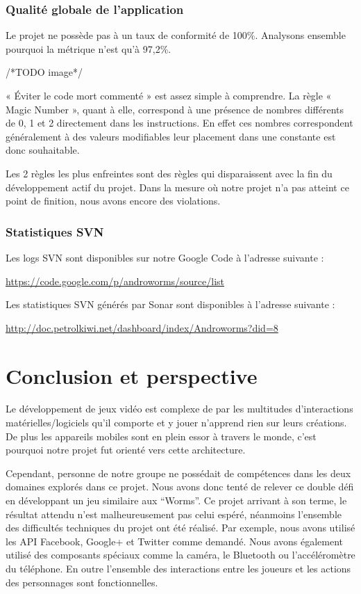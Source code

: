 \documentclass{report}
\begin{document}
\subsubsection{Qualité globale de l’application}

Le projet ne possède pas à un taux de conformité de 100\%. Analysons ensemble pourquoi la  métrique n’est qu’à 97,2\%.

/*TODO image*/

« Éviter le code mort commenté » est assez simple à comprendre. La règle « Magic Number », quant à elle, correspond à une présence de nombres différents de 0, 1 et 2 directement dans les instructions. En effet ces nombres correspondent généralement à des valeurs modifiables leur placement dans une constante est donc souhaitable.

Les 2 règles les plus enfreintes sont des règles qui disparaissent avec la fin du développement actif du projet. Dans la mesure où notre projet n’a pas atteint ce point de finition, nous avons encore des violations.

\subsubsection{Statistiques SVN}

Les logs SVN sont disponibles sur notre Google Code à l’adresse suivante :

\url{https://code.google.com/p/androworms/source/list}

\bigskip

Les statistiques SVN générés par Sonar sont disponibles à l’adresse suivante :

\url{http://doc.petrolkiwi.net/dashboard/index/Androworms?did=8}


\section{Conclusion et perspective}

Le développement de jeux vidéo est complexe de par les multitudes d’interactions matérielles/logiciels qu’il comporte et y jouer n’apprend rien sur leurs créations. De plus les appareils mobiles sont en plein essor à travers le monde, c’est pourquoi notre projet fut orienté vers cette architecture.

Cependant, personne de notre groupe ne possédait de compétences dans les deux domaines explorés dans ce projet. Nous avons donc tenté de relever ce double défi en développant un jeu similaire aux “Worms”. Ce projet arrivant à son terme, le résultat attendu n’est malheureusement pas celui espéré, néanmoins l’ensemble des difficultés techniques du projet ont été réalisé. Par exemple, nous avons utilisé les API Facebook, Google+ et Twitter comme demandé. Nous avons également utilisé des composants spéciaux comme la caméra, le Bluetooth ou l’accéléromètre du téléphone. En outre l’ensemble des interactions entre les joueurs et les actions des personnages sont fonctionnelles. 
\end{document}
